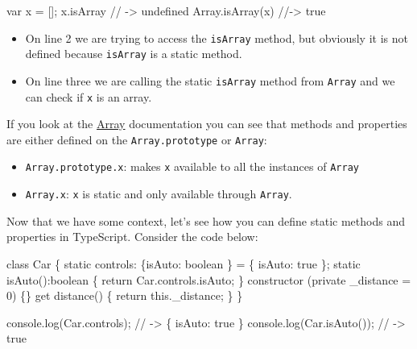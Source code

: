\documentclass[12pt,]{article}
\newenvironment{Shaded}{}{}
\newcommand{\KeywordTok}[1]{\textcolor[rgb]{0.00,0.00,1.00}{{#1}}}
\newcommand{\DataTypeTok}[1]{{#1}}
\newcommand{\DecValTok}[1]{{#1}}
\newcommand{\CommentTok}[1]{\textcolor[rgb]{0.00,0.50,0.00}{{#1}}}
\newcommand{\FunctionTok}[1]{{#1}}
\newcommand{\VariableTok}[1]{{#1}}
\newcommand{\OperatorTok}[1]{{#1}}
\newcommand{\AttributeTok}[1]{{#1}}
\newcommand{\NormalTok}[1]{{#1}}
\providecommand{\tightlist}{%
  \setlength{\itemsep}{0pt}\setlength{\parskip}{0pt}}
\begin{document}
\begin{Shaded}
\begin{Highlighting}[numbers=left,,]
\KeywordTok{var} \NormalTok{x }\OperatorTok{=} \NormalTok{[]}\OperatorTok{;}
\VariableTok{x}\NormalTok{.}\AttributeTok{isArray} \CommentTok{// -> undefined}
\VariableTok{Array}\NormalTok{.}\AttributeTok{isArray}\NormalTok{(x) }\CommentTok{//-> true}
\end{Highlighting}
\end{Shaded}

\begin{itemize}
\tightlist
\item
  On line 2 we are trying to access the \texttt{isArray} method, but
  obviously it is not defined because \texttt{isArray} is a static
  method.
\item
  On line three we are calling the static \texttt{isArray} method from
  \texttt{Array} and we can check if \texttt{x} is an array.
\end{itemize}

If you look at the
\href{https://developer.mozilla.org/en-US/docs/Web/JavaScript/Reference/Global_Objects/Array/isArray}{Array}
documentation you can see that methods and properties are either defined
on the \texttt{Array.prototype} or \texttt{Array}:

\begin{itemize}
\tightlist
\item
  \texttt{Array.prototype.x}: makes \texttt{x} available to all the
  instances of \texttt{Array}
\item
  \texttt{Array.x}: \texttt{x} is static and only available through
  \texttt{Array}.
\end{itemize}

Now that we have some context, let's see how you can define static
methods and properties in TypeScript. Consider the code below:

\begin{Shaded}
\begin{Highlighting}[numbers=left,,]
\KeywordTok{class} \NormalTok{Car \{}
  \DataTypeTok{static} \NormalTok{controls: \{isAuto: }\DataTypeTok{boolean} \NormalTok{\} = \{}
    \NormalTok{isAuto: }\KeywordTok{true}
  \NormalTok{\};}
  \DataTypeTok{static} \FunctionTok{isAuto}\NormalTok{():}\DataTypeTok{boolean} \NormalTok{\{}
    \KeywordTok{return} \NormalTok{Car.}\FunctionTok{controls}\NormalTok{.}\FunctionTok{isAuto}\NormalTok{;}
  \NormalTok{\}}
  \FunctionTok{constructor} \NormalTok{(}\KeywordTok{private} \NormalTok{_distance = }\DecValTok{0}\NormalTok{) \{\}}
  \NormalTok{get }\FunctionTok{distance}\NormalTok{() \{ }\KeywordTok{return} \KeywordTok{this}\NormalTok{.}\FunctionTok{_distance}\NormalTok{; \}}
\NormalTok{\}}

\NormalTok{console.}\FunctionTok{log}\NormalTok{(Car.}\FunctionTok{controls}\NormalTok{); }\CommentTok{// -> \{ isAuto: true \}}
\NormalTok{console.}\FunctionTok{log}\NormalTok{(Car.}\FunctionTok{isAuto}\NormalTok{()); }\CommentTok{// -> true}
\end{Highlighting}
\end{Shaded}
\end{document}
